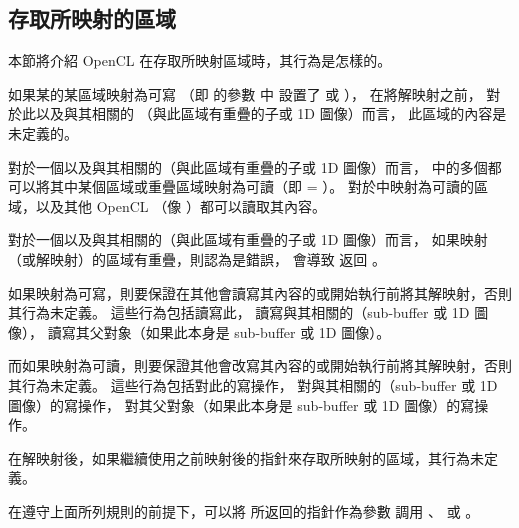\subsection{存取所映射的區域}

本節將介紹 OpenCL  在存取所映射區域時，其行為是怎樣的。

如果某的某區域映射為可寫
（即  的參數  中
設置了  或  ），
在將解映射之前，
對於此以及與其相關的
（與此區域有重疊的子或 1D 圖像）而言，
此區域的內容是未定義的。

對於一個以及與其相關的（與此區域有重疊的子或 1D 圖像）而言，
中的多個都可以將其中某個區域或重疊區域映射為可讀（即  = ）。
對於中映射為可讀的區域，以及其他 OpenCL （像  ）都可以讀取其內容。

對於一個以及與其相關的（與此區域有重疊的子或 1D 圖像）而言，
如果映射（或解映射）的區域有重疊，則認為是錯誤，
會導致  返回 。

如果映射為可寫，則要保證在其他會讀寫其內容的或開始執行前將其解映射，否則其行為未定義。
這些行為包括讀寫此，
讀寫與其相關的（sub-buffer 或 1D 圖像），
讀寫其父對象（如果此本身是 sub-buffer 或 1D 圖像）。

而如果映射為可讀，則要保證其他會改寫其內容的或開始執行前將其解映射，否則其行為未定義。
這些行為包括對此的寫操作，
對與其相關的（sub-buffer 或 1D 圖像）的寫操作，
對其父對象（如果此本身是 sub-buffer 或 1D 圖像）的寫操作。

在解映射後，如果繼續使用之前映射後的指針來存取所映射的區域，其行為未定義。

在遵守上面所列規則的前提下，可以將  所返回的指針作為參數  調用
 、
 或 。

